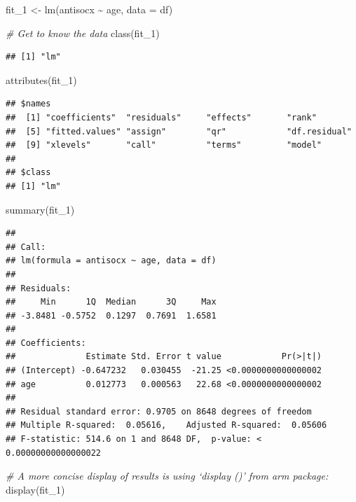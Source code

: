 \documentclass[
]{book}
\newenvironment{Shaded}{\begin{snugshade}}{\end{snugshade}}
\newcommand{\AttributeTok}[1]{\textcolor[rgb]{0.77,0.63,0.00}{#1}}
\newcommand{\CommentTok}[1]{\textcolor[rgb]{0.56,0.35,0.01}{\textit{#1}}}
\newcommand{\FunctionTok}[1]{\textcolor[rgb]{0.00,0.00,0.00}{#1}}
\newcommand{\NormalTok}[1]{#1}
\newcommand{\OtherTok}[1]{\textcolor[rgb]{0.56,0.35,0.01}{#1}}
\newcommand{\SpecialCharTok}[1]{\textcolor[rgb]{0.00,0.00,0.00}{#1}}
\begin{document}
\begin{Shaded}
\begin{Highlighting}[]
\NormalTok{fit\_1 }\OtherTok{\textless{}{-}} \FunctionTok{lm}\NormalTok{(antisocx }\SpecialCharTok{\textasciitilde{}}\NormalTok{ age, }\AttributeTok{data =}\NormalTok{ df)}

\CommentTok{\# Get to know the data}
\FunctionTok{class}\NormalTok{(fit\_1)}
\end{Highlighting}
\end{Shaded}

\begin{verbatim}
## [1] "lm"
\end{verbatim}

\begin{Shaded}
\begin{Highlighting}[]
\FunctionTok{attributes}\NormalTok{(fit\_1)}
\end{Highlighting}
\end{Shaded}

\begin{verbatim}
## $names
##  [1] "coefficients"  "residuals"     "effects"       "rank"         
##  [5] "fitted.values" "assign"        "qr"            "df.residual"  
##  [9] "xlevels"       "call"          "terms"         "model"        
## 
## $class
## [1] "lm"
\end{verbatim}

\begin{Shaded}
\begin{Highlighting}[]
\FunctionTok{summary}\NormalTok{(fit\_1)}
\end{Highlighting}
\end{Shaded}

\begin{verbatim}
## 
## Call:
## lm(formula = antisocx ~ age, data = df)
## 
## Residuals:
##     Min      1Q  Median      3Q     Max 
## -3.8481 -0.5752  0.1297  0.7691  1.6581 
## 
## Coefficients:
##              Estimate Std. Error t value            Pr(>|t|)
## (Intercept) -0.647232   0.030455  -21.25 <0.0000000000000002
## age          0.012773   0.000563   22.68 <0.0000000000000002
## 
## Residual standard error: 0.9705 on 8648 degrees of freedom
## Multiple R-squared:  0.05616,    Adjusted R-squared:  0.05606 
## F-statistic: 514.6 on 1 and 8648 DF,  p-value: < 0.00000000000000022
\end{verbatim}

\begin{Shaded}
\begin{Highlighting}[]
\CommentTok{\# A more concise display of results is using ‘display ()’ from arm package:}
\FunctionTok{display}\NormalTok{(fit\_1)}
\end{Highlighting}
\end{Shaded}
\end{document}
